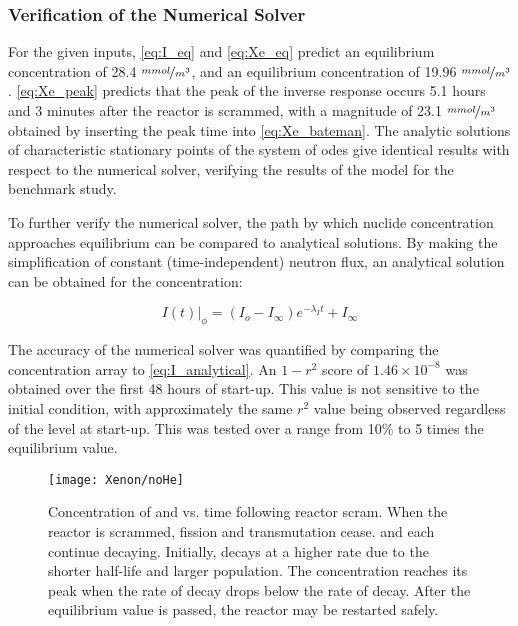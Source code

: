 \subsubsection{Verification of the Numerical Solver} 
For the given inputs, \ref{eq:I_eq} and \ref{eq:Xe_eq} predict an equilibrium \I concentration of 28.4 $\nicefrac{mmol}{m^3}$, and an equilibrium \Xe concentration of 19.96 $\nicefrac{mmol}{m^3}$. \ref{eq:Xe_peak} predicts that the peak of the inverse response occurs 5.1 hours and 3 minutes after the reactor is scrammed, with a magnitude of 23.1 $\nicefrac{mmol}{m^3}$ obtained by inserting the peak time into \ref{eq:Xe_bateman}. The analytic solutions of characteristic stationary points of the system of \acsp{ode} give identical results with respect to the numerical solver, verifying the results of the model for the benchmark study. 

To further verify the numerical solver, the path by which nuclide concentration approaches equilibrium can be compared to analytical solutions. By making the simplification of constant (time-independent) neutron flux, an analytical solution can be obtained for the \I concentration:

\begin{equation}\label{eq:I_analytical}
\left.I(t)\right\rvert_\phi = (I_o-I_\infty)e^{-\lambda_I t}+I_\infty
\end{equation}

The accuracy of the numerical solver was quantified by comparing the \I concentration array to \ref{eq:I_analytical}. An $1-r^2$ score of $1.46\times10^{-8}$ was obtained over the first 48 hours of start-up. This value is not sensitive to the initial condition, with approximately the same $r^2$ value being observed regardless of the \I level at start-up. This was tested over a range from 10\% to 5 times the equilibrium value.

\begin{figure}[ht!]
    \centering
    \texttt{[image: Xenon/noHe]}
    \caption[Concentration of \I and \Xe vs. time following reactor scram]{Concentration of \I and \Xe vs. time following reactor scram. When the reactor is scrammed, fission and transmutation cease. \I and \Xe each continue decaying. Initially, \I decays at a higher rate due to the shorter half-life and larger population. The \Xe concentration reaches its peak when the rate of \I decay drops below the rate of \Xe decay. After the equilibrium value is passed, the reactor may be restarted safely.}
    \label{fig:Control}
\end{figure}

